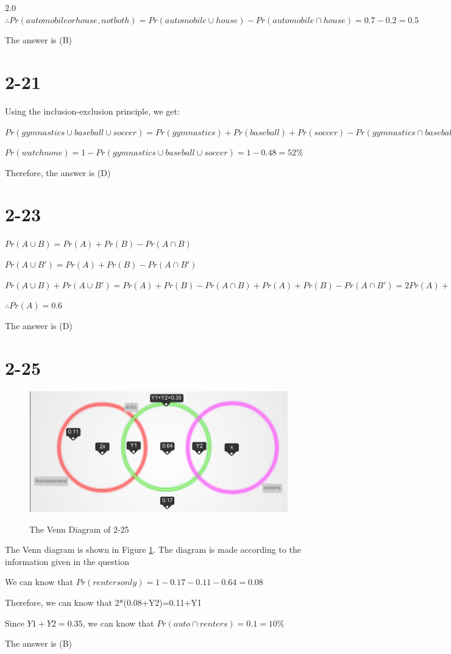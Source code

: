 \documentclass[12pt]{article}
\begin{document}
\begin{spacing}{2.0}
$\therefore Pr(automobile or house, not both)= Pr(automobile\cup house) - Pr(automobile\cap house)= 0.7-0.2=0.5$

The answer is (B)

\section*{2-21}
Using the inclusion-exclusion principle, we get:

$Pr(gymnastics\cup baseball \cup soccer)= Pr(gymnastics)+ Pr(baseball) + Pr(soccer)- Pr(gymnastics\cap baseball)- Pr(gymnastics \cap soccer) - Pr(baseball\cap soccer) + Pr(gymnastics\cap baseball \cap soccer)= 0.28+0.29+0.19-0.14-0.12-0.1+0.08= 0.48$

$Pr(watch none)=1-Pr(gymnastics\cup baseball \cup soccer)= 1-0.48=52\%$

Therefore, the answer is (D)

\section*{2-23}
$Pr(A\cup B)=Pr(A)+Pr(B)-Pr(A\cap B)$

$Pr(A\cup B')=Pr(A)+Pr(B)-Pr(A\cap B')$

$Pr(A\cup B)+ Pr(A\cup B')=Pr(A)+Pr(B)-Pr(A\cap B)+ Pr(A)+Pr(B)-Pr(A\cap B')=2Pr(A)+(Pr(B)+Pr(B'))-(Pr(A\cap B)+Pr(A\cap B'))= 2Pr(A)+1-Pr(A)=Pr(A)+1=1.6$

$\therefore Pr(A)=0.6$

The answer is (D)

\section*{2-25}
\begin{figure}
  \centering
  \includegraphics[width=5in]{venn}\\
  \caption{The Venn Diagram of 2-25}\label{venn}
\end{figure}

The Venn diagram is shown in Figure \ref{venn}. The diagram is made according to the information given in the question

We can know that $Pr(renters only)=1-0.17-0.11-0.64=0.08$

Therefore, we can know that 2*(0.08+Y2)=0.11+Y1

Since $Y1+Y2=0.35$, we can know that $Pr(auto\cap renters)= 0.1=10\%$

The answer is (B)

\end{spacing}
\end{document}
